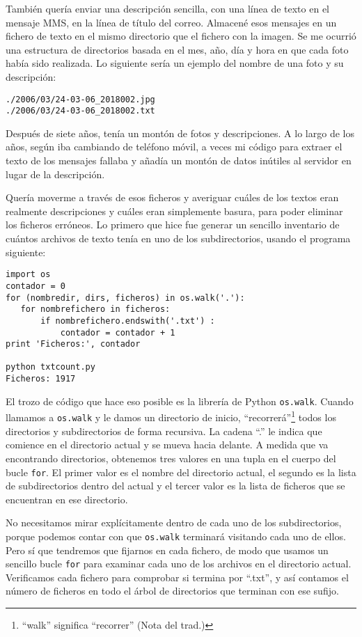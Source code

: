También quería enviar una descripción sencilla, con una línea de texto en el mensaje MMS,
en la línea de título del correo. Almacené esos mensajes
en un fichero de texto en el mismo directorio que el fichero con la imagen.
Se me ocurrió una estructura de directorios basada en el mes, año, día y hora en
que cada foto había sido realizada. Lo siguiente sería un ejemplo del nombre
de una foto y su descripción:

\beforeverb
\begin{verbatim}
./2006/03/24-03-06_2018002.jpg
./2006/03/24-03-06_2018002.txt
\end{verbatim}
\afterverb
%
Después de siete años, tenía un montón de fotos y descripciones. A lo largo de los años,
según iba cambiando de teléfono móvil, a veces mi código para extraer el texto de los mensajes
fallaba y añadía un montón de datos inútiles al servidor en lugar de la descripción.

Quería moverme a través de esos ficheros y averiguar cuáles de los
textos eran realmente descripciones y cuáles eran simplemente basura, para poder eliminar
los ficheros erróneos. Lo primero que hice fue generar un sencillo inventario de
cuántos archivos de texto tenía en uno de los subdirectorios,
usando el programa siguiente:

\beforeverb
\begin{verbatim}
import os
contador = 0
for (nombredir, dirs, ficheros) in os.walk('.'):
   for nombrefichero in ficheros:
       if nombrefichero.endswith('.txt') :
           contador = contador + 1
print 'Ficheros:', contador

python txtcount.py
Ficheros: 1917
\end{verbatim}
\afterverb
%
El trozo de código que hace eso posible es la librería de Python
{\tt os.walk}. Cuando llamamos a {\tt os.walk} y le damos un directorio
de inicio, ``recorrerá''\footnote{``walk'' significa ``recorrer'' (Nota del trad.)}
todos los directorios y subdirectorios de forma recursiva. La cadena ``.'' le indica
que comience en el directorio actual y se mueva hacia delante.
A medida que va encontrando directorios, obtenemos tres valores en una tupla
en el cuerpo del bucle {\tt for}. El primer valor es el nombre del
directorio actual, el segundo es la lista de subdirectorios dentro
del actual y el tercer valor es la lista de ficheros
que se encuentran en ese directorio.

No necesitamos mirar explícitamente dentro de cada uno de los subdirectorios,
porque podemos contar con que {\tt os.walk} terminará visitando cada
uno de ellos. Pero sí que tendremos que fijarnos en cada fichero, de
modo que usamos un sencillo bucle {\tt for} para examinar cada uno de los archivos
en el directorio actual. Verificamos cada fichero para comprobar si
termina por ``.txt'', y así contamos el número de
ficheros en todo el árbol de directorios que terminan con ese
sufijo.

